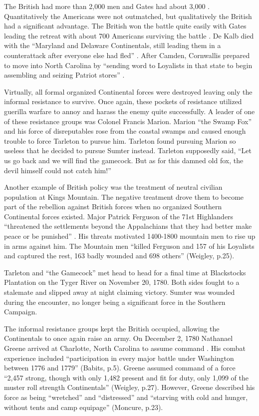   The British had more than 2,000 men and Gates had
about 3,000 \cite[p.19]{weigley_partisan_1970}.  Quantitatively the Americans were not outmatched,
but qualitatively the British had a significant advantage.  The British won the
battle quite easily with Gates leading the retreat with about 700 Americans
surviving the battle \cite[p.21]{weigley_partisan_1970}.  De Kalb died with the “Maryland and
Delaware Continentals, still leading them in a counterattack after everyone else
had fled” \cite[p.21]{weigley_partisan_1970}.  After Camden, Cornwallis prepared to move into North
Carolina by “sending word to Loyalists in that state to begin assembling and
seizing Patriot stores” \cite[p.27]{woodward_comparative_2002}.

Virtually, all formal organized Continental forces were destroyed leaving only
the informal resistance to survive.  Once again, these pockets of resistance
utilized guerilla warfare to annoy and harass the enemy quite successfully.  A
leader of one of these resistance groups was Colonel Francis Marion.  Marion
“the Swamp Fox” and his force of disreputables rose from the coastal swamps and
caused enough trouble to force Tarleton to pursue him.  Tarleton found pursuing
Marion so useless that he decided to pursue Sumter instead.  Tarleton supposedly
said, “Let us go back and we will find the gamecock.  But as for this damned old
fox, the devil himself could not catch him!” \cite[p.23]{weigley_partisan_1970}

Another example of British policy was the treatment of neutral civilian
population at Kings Mountain.  The negative treatment drove them to become part
of the rebellion against British forces when no organized Southern Continental
forces existed.  Major Patrick Ferguson of the 71st Highlanders “threatened the
settlements beyond the Appalachians that they had better make peace or be
punished” \cite[p.24]{weigley_partisan_1970}.  His threats motivated 1400-1800 mountain men to
rise up in arms against him.  The Mountain men “killed Ferguson and 157 of his
Loyalists and captured the rest, 163 badly wounded and 698 others” (Weigley,
p.25).  

Tarleton and “the Gamecock” met head to head for a final time at Blackstocks
Plantation on the Tyger River on November 20, 1780.  Both sides fought to a
stalemate and slipped away at night claiming victory.  Sumter was wounded during
the encounter, no longer being a significant force in the Southern Campaign. 

The informal resistance groups kept the British occupied, allowing the
Continentals to once again raise an army.  On December 2, 1780 Nathanael Greene
arrived at Charlotte, North Carolina to assume command \cite[p.22]{moncure_cowpens_1996}.
His combat experience included “participation in every major battle under
Washington between 1776 and 1779” (Babits, p.5).  Greene assumed command of a
force “2,457 strong, though with only 1,482 present and fit for duty, only 1,099
of the muster roll strength Continentals”  (Weigley, p.27).   However, Greene
described his force as being “wretched” and “distressed” and “starving with cold
and hunger, without tents and camp equipage” (Moncure, p.23). 

